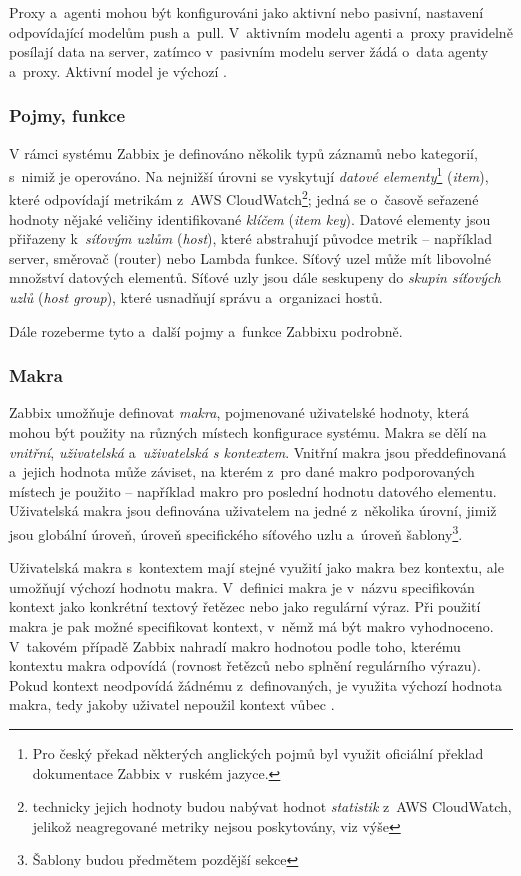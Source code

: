 \documentclass[czech, ing, kiv, he, iso690]{fasthesis}
\begin{document}
Proxy a~agenti mohou být konfigurováni jako aktivní nebo pasivní, nastavení odpovídající modelům push a~pull. V~aktivním modelu agenti a~proxy pravidelně posílají data na server, zatímco v~pasivním modelu server žádá o~data agenty a~proxy. Aktivní model je výchozí \cite{docs.zabbix}.


\subsubsection{Pojmy, funkce}
V rámci systému Zabbix je definováno několik typů záznamů nebo kategorií, s~nimiž je operováno. Na nejnižší úrovni se vyskytují \emph{datové elementy}\footnote{Pro český překad některých anglických pojmů byl využit oficiální překlad dokumentace Zabbix v~ruském jazyce.} (\emph{item}), které odpovídají metrikám z~AWS CloudWatch\footnote{technicky jejich hodnoty budou nabývat hodnot \emph{statistik} z~AWS CloudWatch, jelikož neagregované metriky nejsou poskytovány, viz výše}; jedná se o~časově seřazené hodnoty nějaké veličiny identifikované \emph{klíčem} (\emph{item key}). Datové elementy jsou přiřazeny k~\emph{síťovým uzlům} (\emph{host}), které abstrahují původce metrik -- například server, směrovač (router) nebo Lambda funkce. Síťový uzel může mít libovolné množství datových elementů. Síťové uzly jsou dále seskupeny do \emph{skupin síťových uzlů} (\emph{host group}), které usnadňují správu a~organizaci hostů.

Dále rozeberme tyto a~další pojmy a~funkce Zabbixu podrobně.

\subsubsection{Makra}
Zabbix umožňuje definovat \emph{makra}, pojmenované uživatelské hodnoty, která mohou být použity na různých místech konfigurace systému. Makra se dělí na \emph{vnitřní}, \emph{uživatelská} a~\emph{uživatelská s kontextem}. Vnitřní makra jsou předdefinovaná a~jejich hodnota může záviset, na kterém z~pro dané makro podporovaných místech je použito -- například makro pro poslední hodnotu datového elementu. Uživatelská makra jsou definována uživatelem na jedné z~několika úrovní, jimiž jsou globální úroveň, úroveň specifického síťového uzlu a~úroveň šablony\footnote{Šablony budou předmětem pozdější sekce}.

Uživatelská makra s~kontextem mají stejné využití jako makra bez kontextu, ale umožňují  výchozí hodnotu makra. V~definici makra je v~názvu specifikován kontext jako konkrétní textový řetězec nebo jako regulární výraz. Při použití makra je pak možné specifikovat kontext, v~němž má být makro vyhodnoceno. V~takovém případě Zabbix nahradí makro hodnotou podle toho, kterému kontextu makra odpovídá (rovnost řetězců nebo splnění regulárního výrazu). Pokud kontext neodpovídá žádnému z~definovaných, je využita výchozí hodnota makra, tedy jakoby uživatel nepoužil kontext vůbec \cite{docs.zabbix}.
\end{document}
